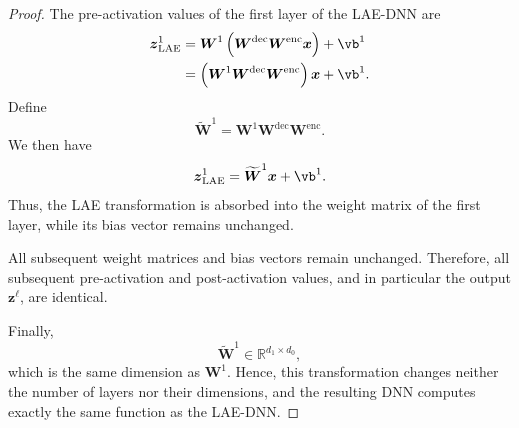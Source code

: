 \begin{proof}[Proof]
	The pre-activation values of the first layer of the LAE-DNN are
	\begin{align*}
		\boldsymbol{z}_{\mathrm{LAE}}^1
		&=
		\boldsymbol{W}^1
		\left(
		\boldsymbol{W}^{\mathrm{dec}}
		\boldsymbol{W}^{\mathrm{enc}}\boldsymbol{x}
		\right)
		+\vb^1 \\
		&=
		\left(
		\boldsymbol{W}^1
		\boldsymbol{W}^{\mathrm{dec}}
		\boldsymbol{W}^{\mathrm{enc}}
		\right)\boldsymbol{x}
		+\vb^1.
	\end{align*}
	Define
	\[
	\widetilde{\boldsymbol{W}}^1
	=
	\boldsymbol{W}^1
	\boldsymbol{W}^{\mathrm{dec}}
	\boldsymbol{W}^{\mathrm{enc}}.
	\]
	We then have
	\[
	\boldsymbol{z}_{\mathrm{LAE}}^1
	=
	\widetilde{\boldsymbol{W}}^1\boldsymbol{x}
	+\vb^1.
	\]
	Thus, the LAE transformation is absorbed into the weight matrix of
	the first layer, while its bias vector remains unchanged.
	
	All subsequent weight matrices and bias vectors remain unchanged.
	Therefore, all subsequent pre-activation and post-activation values,
	and in particular the output $\boldsymbol{z}^{\ell}$, are identical.
	
	Finally,
	\[
	\widetilde{\boldsymbol{W}}^1
	\in\mathbb{R}^{d_1\times d_0},
	\]
	which is the same dimension as $\boldsymbol{W}^1$. Hence, this
	transformation changes neither the number of layers nor their
	dimensions, and the resulting DNN computes exactly the same function
	as the LAE-DNN.
\end{proof}


